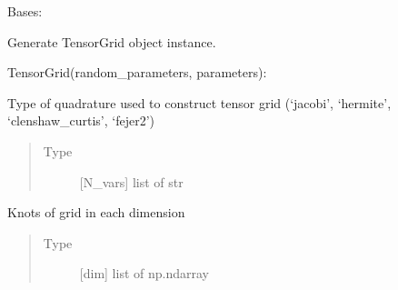 \documentclass[letterpaper,10pt,english,openany,oneside]{sphinxmanual}
\begin{document}

\begin{fulllineitems}
\label{\detokenize{pygpc:pygpc.Grid.TensorGrid}}
Bases: {\hyperref[\detokenize{pygpc:pygpc.Grid.Grid}]{}}

Generate TensorGrid object instance.

TensorGrid(random\_parameters, parameters):

\begin{fulllineitems}
\label{\detokenize{pygpc:pygpc.Grid.TensorGrid.grid_type}}
Type of quadrature used to construct tensor grid (‘jacobi’, ‘hermite’, ‘clenshaw\_curtis’, ‘fejer2’)
\begin{quote}\begin{description}
\item[{Type}] \leavevmode
{[}N\_vars{]} list of str

\end{description}\end{quote}

\end{fulllineitems}


\begin{fulllineitems}
\label{\detokenize{pygpc:pygpc.Grid.TensorGrid.knots_dim_list}}
Knots of grid in each dimension
\begin{quote}\begin{description}
\item[{Type}] \leavevmode
{[}dim{]} list of np.ndarray

\end{description}\end{quote}

\end{fulllineitems}



\end{fulllineitems}
\end{document}
